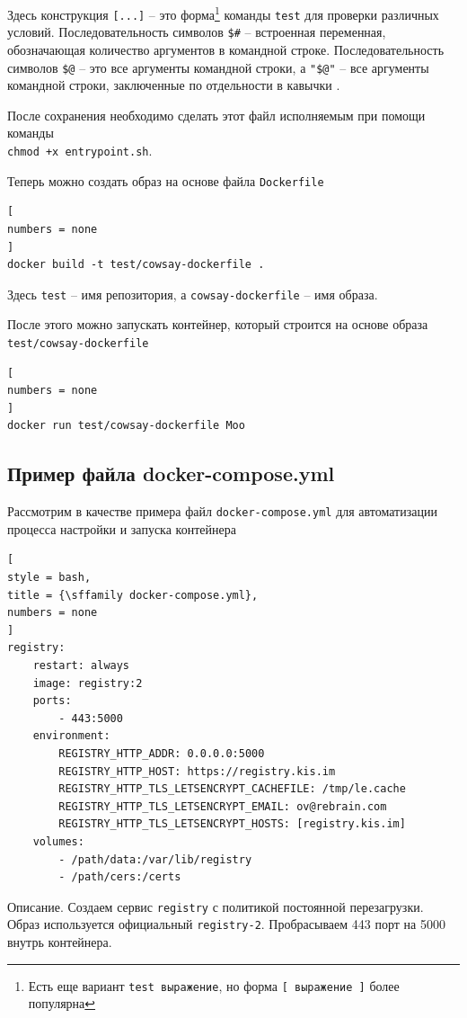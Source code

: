 \documentclass[%
	11pt,
	a4paper,
	utf8,
		]{article}
\begin{document}
Здесь конструкция \texttt{[...]} -- это форма\footnote{Есть еще вариант \texttt{test выражение}, но форма \texttt{[ выражение ]} более популярна} команды \texttt{test} для проверки различных условий. Последовательность символов \texttt{\$\#} -- встроенная переменная, обозначающая количество аргументов в командной строке. Последовательность символов \texttt{\$@} -- это все аргументы командной строки, а \texttt{"\$@"} -- все аргументы командной строки, заключенные по отдельности в кавычки \cite[]{robbins:bash-2017}.

После сохранения необходимо сделать этот файл исполняемым при помощи команды\\ \texttt{chmod +x entrypoint.sh}.

Теперь можно создать образ на основе файла \texttt{Dockerfile}
\begin{lstlisting}[
numbers = none
]
docker build -t test/cowsay-dockerfile .
\end{lstlisting}

Здесь \texttt{test} -- имя репозитория, а \texttt{cowsay-dockerfile} -- имя образа.

После этого можно запускать контейнер, который строится на основе образа \verb|test/cowsay-dockerfile|
\begin{lstlisting}[
numbers = none
]
docker run test/cowsay-dockerfile Moo
\end{lstlisting}

\subsection{Пример файла docker-compose.yml}

Рассмотрим в качестве примера файл \texttt{docker-compose.yml} для автоматизации процесса настройки и запуска контейнера
\begin{lstlisting}[
style = bash,
title = {\sffamily docker-compose.yml},
numbers = none
]
registry:
    restart: always
    image: registry:2
    ports:
        - 443:5000
    environment:
        REGISTRY_HTTP_ADDR: 0.0.0.0:5000
        REGISTRY_HTTP_HOST: https://registry.kis.im
        REGISTRY_HTTP_TLS_LETSENCRYPT_CACHEFILE: /tmp/le.cache
        REGISTRY_HTTP_TLS_LETSENCRYPT_EMAIL: ov@rebrain.com
        REGISTRY_HTTP_TLS_LETSENCRYPT_HOSTS: [registry.kis.im]
    volumes:
        - /path/data:/var/lib/registry
        - /path/cers:/certs
\end{lstlisting}

Описание. Создаем сервис \texttt{registry} с политикой постоянной перезагрузки. Образ используется официальный \texttt{registry-2}. Пробрасываем 443 порт на 5000 внутрь контейнера.
\end{document}
